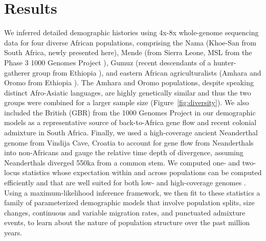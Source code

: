 \documentclass[]{article}
\begin{document}
\section*{Results}

We inferred detailed demographic histories using 4x-8x whole-genome sequencing
data for four diverse African populations, comprising the Nama (Khoe-San from
South Africa, newly presented here), Mende (from Sierra Leone, MSL from the
Phase 3 1000 Genomes Project \citep{1000_Genomes_Project_Consortium2015-zq}),
Gumuz (recent descendants of a hunter-gatherer group from Ethiopia
\citep{Gurdasani2015-qy,Gopalan2022-pw}), and eastern African agriculturalists
(Amhara and Oromo from Ethiopia \citep{Gurdasani2015-qy}). The Amhara and Oromo
populations, despite speaking distinct Afro-Asiatic languages, are highly
genetically similar \citep{Pagani2015-pz,Gopalan2022-pw} and thus the two
groups were combined for a larger sample size (Figure~\ref{fig:diversity}). We also
included the British (GBR) from the 1000 Genomes Project in our demographic
models as a representative source of back-to-Africa gene flow and recent
colonial admixture in South Africa. Finally, we used a high-coverage ancient
Neanderthal genome from Vindija Cave, Croatia \citep{Prufer2017-kk} to account
for gene flow from Neanderthals into non-Africans and gauge the relative
time depth of divergence, assuming Neanderthals diverged 550ka from a common
stem. We computed one- and two-locus statistics whose expectation within and across 
populations can be computed efficiently and that are well suited for both low- and
high-coverage genomes \citep{Ragsdale2019-nt,Ragsdale2020-nz}. Using a
maximum-likelihood inference framework, we then fit to these statistics a
family of parameterized demographic models that involve population splits, size
changes, continuous and variable migration rates, and punctuated admixture
events, to learn about the nature of population structure over the past million
years.
\end{document}

